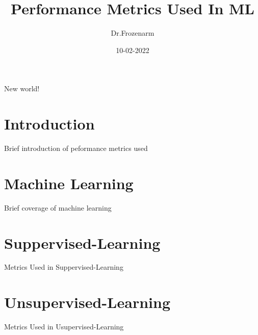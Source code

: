 \documentclass{article}
\title{Performance Metrics Used In ML}
\date{10-02-2022}
\author{Dr.Frozenarm}
\begin{document}
    \maketitle
    \newpage
    
    New world!
    \section{Introduction}
    Brief introduction of peformance metrics used 
    \section{Machine Learning}
    Brief coverage of machine learning
    \section{Suppervised-Learning}
    Metrics Used in Suppervised-Learning
    \section{Unsupervised-Learning}
    Metrics Used in Usupervised-Learning
\end{document}

